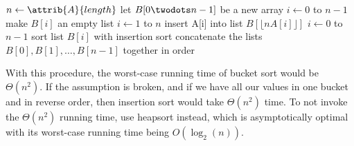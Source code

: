 \documentclass{article}
\begin{document}
\begin{codebox}
\li $n \gets \attrib{A}{length}$
\li let $B[0 \twodots n-1]$ be a new array
\li \For $i \gets 0$ to $n-1$
\li     \Do
            make $B[i]$ an empty list
        \End
\li \For $i \gets 1$ to $n$
\li     \Do
            insert A[i] into list $B[\lfloor n A[i] \rfloor]$
        \End 
\li \For $i \gets 0$ to $n-1$
\li     \Do
            sort list $B[i]$ with insertion sort
        \End
\li concatenate the lists $B[0], B[1], \ldots, B[n-1]$ together in order
\end{codebox}

With this procedure, the worst-case running time of bucket sort would be $\Theta(n^{2})$. If the assumption is broken, and if we have all our values in one bucket and in reverse order, then insertion sort would take $\Theta(n^{2})$ time. To not invoke the $\Theta{(n^2)}$ running time, use heapsort instead, which is asymptotically optimal with its worst-case running time being $O(\log_2(n))$.
\end{document}
